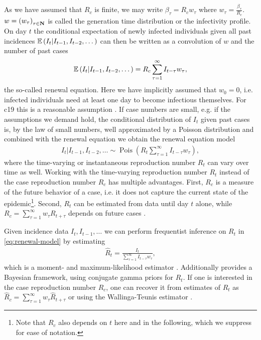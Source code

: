 As we have assumed that $R_{c}$ is finite, we may write $\beta_{\tau} = R_{c}w_{\tau}$ where $w_{\tau} = \frac{\beta_{\tau}}{R_{c}}$. $w = \left( w_{\tau} \right)_{\tau \in \mathbf N}$ is called the generation time distribution or the infectivity profile. On day $t$ the conditional expectation of newly infected individuals given all past incidences $\mathbb E \left(I_{t}| I_{t - 1}, I_{t - 2}, \dots \right)$  can then be written as a convolution of $w$ and the number of past cases 
\begin{align}
    \label{eq:renewal-eq}
\mathbb E \left(I_{t}| I_{t - 1}, I_{t - 2}, \dots \right) = R_{c} \sum_{\tau = 1}^\infty I_{t - \tau} w_{\tau},
\end{align}
the so-called renewal equation. Here we have implicitly assumed that $w_{0} = 0$, i.e. infected individuals need at least one day to become infectious themselves. For \gls{c19} this is a reasonable assumption \citep{Lauer2020Incubation}. If case numbers are small, e.g. if the assumptions we demand hold, the conditional distribution of $I_{t}$ given past cases is, by the law of small numbers, well approximated by a Poisson distribution and combined with the renewal equation we obtain the renewal equation model \citep{Fraser2007Estimating}
\begin{align}
    \label{eq:renewal-model}
    I_{t} | I_{t - 1}, I_{t - 2}, \dots \sim \operatorname{Pois} \left( R_{t} \sum _{\tau = 1}^\infty I_{t - \tau} w_{\tau} \right),
\end{align}
where the time-varying or instantaneous reproduction number $R_{t}$ can vary over time as well. Working with the time-varying reproduction number $R_{t}$ instead of the case reproduction number $R_{c}$ has multiple advantages. 
First, $R_{c}$ is a measure of the future behavior of a case, i.e. it does not capture the current state of the epidemic\footnote{Note that $R_{c}$ also depends on $t$ here and in the following, which we suppress for ease of notation.}. 
Second, $R_{t}$ can be estimated from data until day $t$ alone, while $R_{c} = \sum_{\tau = 1}^{\infty} w_{\tau} R_{ t + \tau }$ depends on future cases \citep{Fraser2007Estimating}.


Given incidence data $I_{t}, I_{t - 1}, \dots $ we can perform frequentist inference on $R_{t}$ in \eqref{eq:renewal-model} by estimating
\begin{align}
    \label{eq:hatR}
    \hat R_{t} = \frac{I_{t}}{\sum_{\tau = 1}^{\infty} I_{t - \tau} w_{\tau}},
\end{align}
which is a moment- and maximum-likelihood estimator \citep{Hotz2020Monitoring}. Additionally \citep{Cori2021EpiEstim} provides a Bayesian framework, using conjugate gamma priors for $R_{t}$. If one is interested in the case reproduction number $R_{c}$, one can recover it from estimates of $R_{t}$ as $\hat R_{c} = \sum_{\tau = 1}^\infty w_{\tau} \hat R_{t + \tau}$ or using the Wallinga-Teunis estimator \citep{Wallinga2004Different}.

